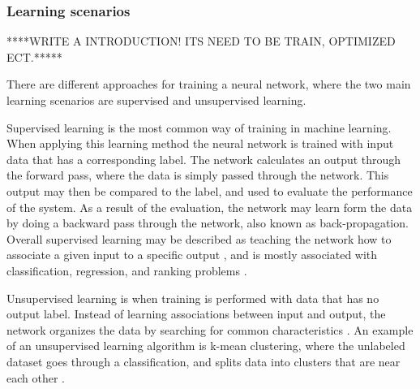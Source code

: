 


\subsubsection{Learning scenarios}
****WRITE A INTRODUCTION! ITS NEED TO BE TRAIN, OPTIMIZED ECT.*****

There are different approaches for training a neural network, where the two main learning scenarios are supervised and unsupervised learning. 

\noindent
Supervised learning is the most common way of training in machine learning. When applying this learning method the neural network is trained with input data that has a corresponding label. The network calculates an output through the forward pass, where the data is simply passed through the network. This output may then be compared to the label, and used to evaluate the performance of the system. As a result of the evaluation, the network may learn form the data by doing a backward pass through the network, also known as back-propagation.\citep{LeCun2015} Overall supervised learning may be described as teaching the network how to associate a given input to a specific output \citep{Goodfellow2016}, and is mostly associated with classification, regression, and ranking problems \citep{Mehryar2012}. 

\noindent
Unsupervised learning is when training is performed with data that has no output label. Instead of learning associations between input and output, the network organizes the data by searching for common characteristics \citep{Mehryar2012}. An example of an unsupervised learning algorithm is k-mean clustering, where the unlabeled dataset goes through a classification, and splits data into clusters that are near each other \citep{Goodfellow2016}.  


